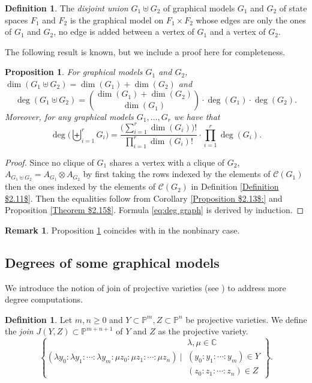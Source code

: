 \documentclass[11pt]{amsart}
\numberwithin{equation}{section}
\theoremstyle{plain}
\numberwithin{theorem}{section}
\newtheorem{proposition}[theorem]{Proposition}
\theoremstyle{definition}
\newtheorem{definition}[theorem]{Definition}
\newtheorem{remark}[theorem]{Remark}
\begin{document}
\begin{definition}
    The \textit{disjoint union} $G_1\uplus G_2$ of graphical models $G_1$ and $G_2$ of state spaces $F_1$ and $F_2$ is the graphical model on $F_1\times F_2$ whose edges are only the ones of $G_1$ and $G_2$, no edge is added between a vertex of $G_1$ and a vertex of $G_2$.
\end{definition}
The following result is known, but we include a proof here for completeness.
\begin{proposition}\label{Theorem $2.16$}
For graphical models $G_1$ and $G_2$, $\dim(G_1\uplus G_2)=\dim(G_1)+\dim(G_2)$ and $$\deg(G_1\uplus G_2)={\dim(G_1)+\dim(G_2)\choose\dim(G_1)}\cdot\deg(G_1)\cdot\deg(G_2).$$
Moreover, for any graphical models $G_1,\ldots,G_r$ we have that \begin{equation}\label{eq:deg graph}\deg\bigg(\biguplus_{i=1}^rG_i\bigg)=
\frac{\bigg(\displaystyle\sum_{i=1}^r\dim(G_i)\bigg)!}{\displaystyle\prod_{i=1}^r\dim(G_i)!}\cdot\prod_{i=1}^r\deg(G_i).\end{equation}
\end{proposition}
\begin{proof}
    Since no clique of $G_1$ shares a vertex with a clique of $G_2$, $A_{G_1\uplus G_2}=A_{G_1}\otimes A_{G_2}$ by first taking the rows indexed by the elements of $\mathcal C(G_1)$ then the ones indexed by the elements of $\mathcal C(G_2)$ in Definition \ref{Definition $2.11$}. Then the equalities follow from Corollary \ref{Proposition $2.13$:} and Proposition \ref{Theorem $2.15$}. Formula \eqref{eq:deg graph} is derived by induction.
\end{proof}

\begin{remark}
    Proposition \ref{Theorem $2.16$} coincides with \cite[Lemma $5.4$]{develin2003markov} in the nonbinary case.
\end{remark}

\subsection{Degrees of some graphical models}\label{more degrees} We introduce the notion of join of projective varieties (see \cite[Section 1.2]{kuznetsov2021categorical}) to address more degree computations.


\begin{definition}
\label{def cartesian}
    Let $m,n\ge0$ and $Y\subset\mathbb P^m,Z\subset\mathbb P^n$ be projective varieties. We define the \textit{join} $J(Y,Z)\subset\mathbb P^{m+n+1}$ of $Y$ and $Z$ as the projective variety. $$\left\{(\lambda y_0:\lambda y_1:\cdots:\lambda y_m:\mu z_0:\mu z_1:\cdots:\mu z_n)~\Bigg|~\begin{matrix}
    \lambda,\mu\in\mathbb C\\
    (y_0:y_1:\cdots:y_m)\in Y\\
    (z_0:z_1:\cdots:z_n)\in Z
\end{matrix}\right\}.$$
\end{definition}
\end{document}
